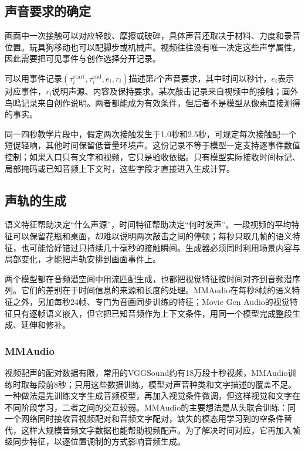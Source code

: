 \subsection{声音要求的确定}
\label{sec:vision-multigen-audio-conditions}

画面中一次接触可以对应轻敲、摩擦或破碎，具体声音还取决于材料、力度和录音位置。玩具狗移动也可以配脚步或机械声。视频往往没有唯一决定这些声学属性，因此需要把可见事件与创作选择分开记录。

可以用事件记录$(\tau_i^{\mathrm{start}},\tau_i^{\mathrm{end}},e_i,r_i)$描述第$i$个声音要求，其中时间以秒计，$e_i$表示对应事件，$r_i$说明声源、内容及保持要求。某次敲击记录来自视频中的接触；画外鸟鸣记录来自创作说明。两者都能成为有效条件，但后者不是模型从像素直接测得的事实。

同一四秒教学片段中，假定两次接触发生于1.0秒和2.5秒，可规定每次接触配一个短促轻响，其他时间保留低音量环境声。这份记录不等于模型一定支持逐事件数值控制；如果入口只有文字和视频，它只是验收依据。只有模型实际接收时间标记、局部掩码或已知音频上下文时，这些字段才直接进入生成计算。

\subsection{声轨的生成}
\label{sec:vision-multigen-audio-alignment}

语义特征帮助决定“什么声源”，时间特征帮助决定“何时发声”。一段视频的平均特征可以保留花瓶和桌面，却难以说明两次敲击之间的停顿；每秒只取几帧的语义特征，也可能恰好错过只持续几十毫秒的接触瞬间。生成器必须同时利用场景内容与局部变化，才能把声轨安排到画面事件上。

两个模型都在音频潜空间中用流匹配生成，也都把视觉特征按时间对齐到音频潜序列。它们的差别在于时间信息的来源和长度的处理。MMAudio在每秒8帧的语义特征之外，另加每秒24帧、专门为音画同步训练的特征；Movie Gen Audio的视觉特征只有逐帧语义嵌入，但它把已知音频作为上下文条件，用同一个模型完成整段生成、延伸和修补。

\subsubsection{MMAudio}
\label{sec:vision-multigen-mmaudio}

视频配声的配对数据有限，常用的VGGSound约有18万段十秒视频，MMAudio训练时取每段前8秒；只用这些数据训练，模型对声音种类和文字描述的覆盖不足。一种做法是先训练文字生成音频模型，再加入视觉条件微调，但这样视觉和文字在不同阶段学习，二者之间的交互较弱。MMAudio的主要想法是从头联合训练：同一个网络同时接收音视频配对和音频文字配对，缺失的模态用学习到的空条件替代，这样大规模音频文字数据也能帮助视频配声。为了解决时间对应，它再加入帧级同步特征，以逐位置调制的方式影响音频生成。


